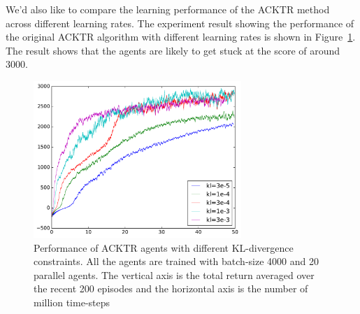 We'd also like to compare the learning performance of the ACKTR method across different learning rates. The experiment result showing the performance of the original ACKTR algorithm with different learning rates is shown in Figure~\ref{fig_acktr_mom_tune}. The result shows that the agents are likely to get stuck at the score of around 3000. 
\begin{figure}[!htbp]
	\includegraphics[width=0.7\textwidth]{images/rec_acktr_mom_tune}
	\centering
	\caption{Performance of ACKTR agents with different KL-divergence constraints. All the agents are trained with batch-size 4000 and 20 parallel agents. The vertical axis is the total return averaged over the recent 200 episodes and the horizontal axis is the number of million time-steps}\label{fig_acktr_mom_tune}
\end{figure}

